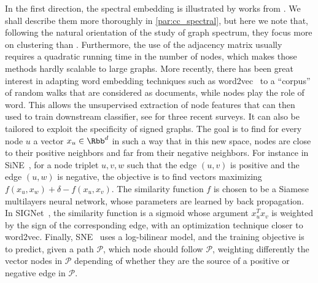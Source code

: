 \begin{newcontent}
In the first direction, the spectral embedding is illustrated by works from
\textcites{Kunegis2009}{SignedEmbedding15}. We shall describe them more thoroughly in
\autoref{par:cc_spectral}, but here we note that, following the natural orientation of the study of
graph spectrum, they focus more on clustering than \esp{}. Furthermore, the
use of the adjacency matrix usually requires a quadratic running time in the number of nodes, which
makes those methods hardly scalable to large graphs. More recently, there has been great interest in
adapting word embedding techniques such as \textsf{word2vec}~\autocite{word2vec13} to a
\enquote{corpus} of random walks that are considered as documents, while nodes play the role of
word. This allows the unsupervised extraction of node features that can then used to train
downstream classifier, see
\autocites{nodeEmbeddingsurvey16}{representationLearning17}{graphEmbeddingSurvey17} for three recent
surveys. It can also be
tailored to exploit the specificity of signed graphs.
The goal is to find for every node $u$ a vector $x_u\in\Rbb^d$ in such a way that in this new space,
nodes are close to their positive neighbors and far from their negative neighbors. For instance in
SiNE~\autocite{neuralSigned17}, for a node triplet $u,v,w$ such that the edge $(u,v)$ is positive
and the edge $(u,w)$ is negative, the objective is to find vectors maximizing $f(x_u, x_w) + \delta
- f(x_u, x_v)$. The similarity function $f$ is chosen to be a Siamese multilayers neural network,
whose parameters are learned by back propagation. In SIGNet~\autocite{SIGNet17}, the similarity
function is a sigmoid whose argument $x_u^Tx_v$ is weighted by the sign of the corresponding edge,
with an optimization technique closer to \textsf{word2vec}. Finally, SNE~\autocite{SNE17} uses a
log-bilinear model, and the training objective is to predict, given a path $\mathcal{P}$, which node
should follow $\mathcal{P}$, weighting differently the vector nodes in $\mathcal{P}$ depending of
whether they are the source of a positive or negative edge in $\mathcal{P}$.

\medskip


\end{newcontent}
